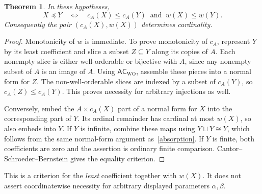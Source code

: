 \documentclass[11pt,a4paper]{article}
\newcommand{\ACWO}{\mathsf{AC}_{\mathrm{WO}}}
\newtheorem{theorem}{Theorem}[section]
\theoremstyle{definition}
\theoremstyle{remark}
\begin{document}
\begin{theorem}\label{order}
In these hypotheses,
\[
 X\preccurlyeq Y
 \quad\Longleftrightarrow\quad
 c_A(X)\le c_A(Y)\ \text{ and }\ w(X)\le w(Y).
\]
Consequently the pair $(c_A(X),w(X))$ determines cardinality.
\end{theorem}
\begin{proof}
Monotonicity of $w$ is immediate. To prove monotonicity of $c_A$, represent $Y$ by its least coefficient and slice a subset $Z\subseteq Y$ along its copies of $A$. Each nonempty slice is either well-orderable or bijective with $A$, since any nonempty subset of $A$ is an image of $A$. Using $\ACWO$, assemble these pieces into a normal form for $Z$. The non-well-orderable slices are indexed by a subset of $c_A(Y)$, so $c_A(Z)\le c_A(Y)$. This proves necessity for arbitrary injections as well.

Conversely, embed the $A\times c_A(X)$ part of a normal form for $X$ into the corresponding part of $Y$. Its ordinal remainder has cardinal at most $w(X)$, so also embeds into $Y$. If $Y$ is infinite, combine these maps using $Y\sqcup Y\cong Y$, which follows from the same normal-form argument as~\eqref{absorption}. If $Y$ is finite, both coefficients are zero and the assertion is ordinary finite comparison. Cantor--Schroeder--Bernstein gives the equality criterion.
\end{proof}

This is a criterion for the \emph{least} coefficient together with $w(X)$. It does not assert coordinatewise necessity for arbitrary displayed parameters $\alpha,\beta$.
\end{document}
